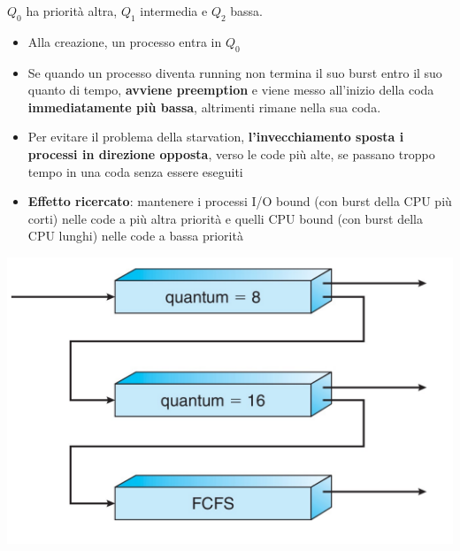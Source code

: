 \documentclass[12pt]{article}
\begin{document}
$Q_0$ ha priorità altra, $Q_1$ intermedia e $Q_2$ bassa.
\begin{itemize}
    \item Alla creazione, un processo entra in $Q_0$
    \item Se quando un processo diventa running non termina il suo burst entro il suo quanto di tempo, \textbf{avviene preemption} e viene messo all'inizio della coda \textbf{immediatamente più bassa}, altrimenti rimane nella sua coda.
    \item Per evitare il problema della starvation, \textbf{l'invecchiamento sposta i processi in direzione opposta}, verso le code più alte, se passano troppo tempo in una coda senza essere eseguiti
    \item \textbf{Effetto ricercato}: mantenere i processi I/O bound (con burst della CPU più corti) nelle code a più altra priorità e quelli CPU bound (con burst della CPU lunghi) nelle code a bassa priorità
\end{itemize}
\begin{center}
    \includegraphics[width = 0.50\linewidth]{Images/52.png}
\end{center}
\end{document}
